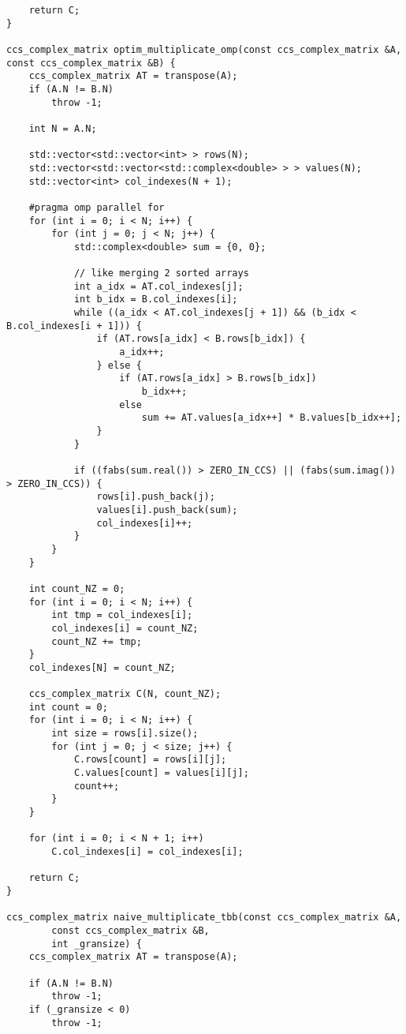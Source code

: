 \documentclass{report}
\begin{document}
\begin{lstlisting}
    return C;
}

ccs_complex_matrix optim_multiplicate_omp(const ccs_complex_matrix &A, const ccs_complex_matrix &B) {
    ccs_complex_matrix AT = transpose(A);
    if (A.N != B.N)
        throw -1;

    int N = A.N;

    std::vector<std::vector<int> > rows(N);
    std::vector<std::vector<std::complex<double> > > values(N);
    std::vector<int> col_indexes(N + 1);

    #pragma omp parallel for
    for (int i = 0; i < N; i++) {
        for (int j = 0; j < N; j++) {
            std::complex<double> sum = {0, 0};

            // like merging 2 sorted arrays
            int a_idx = AT.col_indexes[j];
            int b_idx = B.col_indexes[i];
            while ((a_idx < AT.col_indexes[j + 1]) && (b_idx < B.col_indexes[i + 1])) {
                if (AT.rows[a_idx] < B.rows[b_idx]) {
                    a_idx++;
                } else {
                    if (AT.rows[a_idx] > B.rows[b_idx])
                        b_idx++;
                    else
                        sum += AT.values[a_idx++] * B.values[b_idx++];
                }
            }

            if ((fabs(sum.real()) > ZERO_IN_CCS) || (fabs(sum.imag()) > ZERO_IN_CCS)) {
                rows[i].push_back(j);
                values[i].push_back(sum);
                col_indexes[i]++;
            }
        }
    }

    int count_NZ = 0;
    for (int i = 0; i < N; i++) {
        int tmp = col_indexes[i];
        col_indexes[i] = count_NZ;
        count_NZ += tmp;
    }
    col_indexes[N] = count_NZ;

    ccs_complex_matrix C(N, count_NZ);
    int count = 0;
    for (int i = 0; i < N; i++) {
        int size = rows[i].size();
        for (int j = 0; j < size; j++) {
            C.rows[count] = rows[i][j];
            C.values[count] = values[i][j];
            count++;
        }
    }

    for (int i = 0; i < N + 1; i++)
        C.col_indexes[i] = col_indexes[i];

    return C;
}

ccs_complex_matrix naive_multiplicate_tbb(const ccs_complex_matrix &A,
        const ccs_complex_matrix &B,
        int _gransize) {
    ccs_complex_matrix AT = transpose(A);

    if (A.N != B.N)
        throw -1;
    if (_gransize < 0)
        throw -1;


\end{lstlisting}
\end{document}
